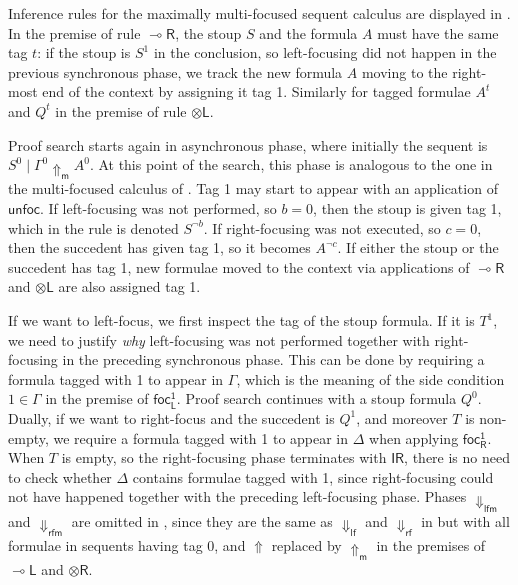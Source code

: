 \documentclass[runningheads]{llncs}
\newcommand{\tl}{\otimes \mathsf{L}}
\newcommand{\tr}{\otimes \mathsf{R}}
\newcommand{\lright}{{\multimap}\mathsf{R}}
\newcommand{\lleft}{{\multimap}\mathsf{L}}
\newcommand{\pass}{\mathsf{pass}}
\newcommand{\unitr}{\mathsf{IR}}
\newcommand{\otL}{\tl}
\newcommand{\otR}{\tr}
\newcommand{\lolliR}{\lright}
\newcommand{\lolliL}{\lleft}
\newcommand{\IR}{\unitr}
\newcommand{\lfm}{\dn_\mathsf{lfm}}%
\newcommand{\rfm}{\dn_\mathsf{rfm}}%
\newcommand{\lf}{\dn_\mathsf{lf}}%
\newcommand{\rf}{\dn_\mathsf{rf}}%
\newcommand{\red}[1]{{#1^1}}
\newcommand{\green}[1]{{#1^0}}
\newcommand{\up}{\Uparrow}
\newcommand{\dn}{\Downarrow}
\newcommand{\upm}{\Uparrow_{\mathsf{m}}}
\newcommand{\focLred}{\mathsf{foc_L^1}}
\newcommand{\focRred}{\mathsf{foc_R^1}}
\newcommand{\unfoc}{\mathsf{unfoc}}
\begin{document}
Inference rules for the maximally multi-focused sequent calculus are displayed in . In the premise of rule $\lolliR$, the stoup $S$ and the formula $A$ must have the same tag $t$: if the stoup is $S^1$ in the conclusion, so left-focusing did not happen in the previous synchronous phase, we track the new formula $A$ moving to the right-most end of the context by assigning it tag 1.
Similarly for tagged formulae $A^t$ and $Q^t$ in the premise of rule $\otL$.

Proof search starts again in asynchronous phase, where initially the sequent is $\green{S} \mid \green{\Gamma} \upm \green{A}$. At this point of the search, this phase is analogous to the one in the multi-focused calculus of . Tag 1 may start to appear with an application of $\unfoc$. If left-focusing was not performed, so $b = 0$, then the stoup is given tag 1, which in the rule is denoted $S^{\neg b}$. If right-focusing was not executed, so $c = 0$, then the succedent has given tag 1, so it becomes  $A^{\neg c}$. If either the stoup or the succedent has tag 1, new formulae moved to the context via applications of $\lolliR$ and $\otL$ are also assigned tag 1.

If we want to left-focus, we first inspect the tag of the stoup formula. If it is $T^1$, we need to justify \emph{why} left-focusing was not performed together with right-focusing in the preceding synchronous phase. This can be done by requiring a formula tagged with 1 to appear in $\Gamma$, which is the meaning of the side condition $1 \in \Gamma$ in the premise of $\focLred$. Proof search continues with a stoup formula $\green{Q}$. Dually, if we want to right-focus and the succedent is $Q^1$, and moreover $T$ is non-empty, we require a formula tagged with 1 to appear in $\Delta$ when applying $\focRred$. When $T$ is empty, so the right-focusing phase terminates with $\IR$, there is no need to check whether $\Delta$ contains formulae tagged with 1, since right-focusing could not have happened together with the preceding left-focusing phase. Phases $\lfm$ and $\rfm$ are omitted in , since they are the same as $\lf$ and $\rf$ in  but with all formulae in sequents having tag 0, and $\up$ replaced by $\upm$ in the premises of $\lolliL$ and $\otR$.

\end{document}

